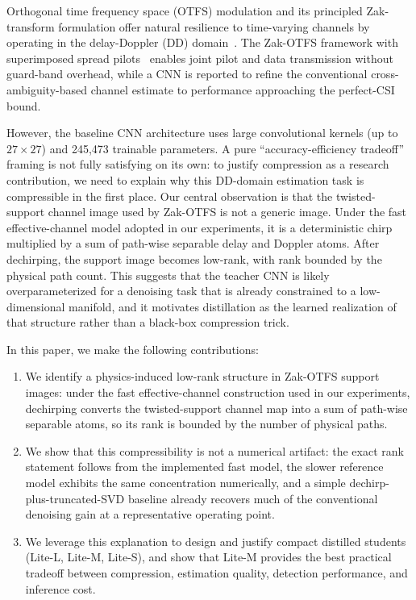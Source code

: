 \documentclass[conference]{IEEEtran}
\begin{document}
Orthogonal time frequency space (OTFS) modulation and its principled Zak-transform formulation offer natural resilience to time-varying channels by operating in the delay-Doppler (DD) domain~\cite{hadani2017otfs, mohammed2021ddzc}. The Zak-OTFS framework with superimposed spread pilots~\cite{zakotfs2024} enables joint pilot and data transmission without guard-band overhead, while a CNN is reported to refine the conventional cross-ambiguity-based channel estimate to performance approaching the perfect-CSI bound.

However, the baseline CNN architecture uses large convolutional kernels (up to $27 \times 27$) and 245,473 trainable parameters. A pure ``accuracy-efficiency tradeoff'' framing is not fully satisfying on its own: to justify compression as a research contribution, we need to explain why this DD-domain estimation task is compressible in the first place. Our central observation is that the twisted-support channel image used by Zak-OTFS is not a generic image. Under the fast effective-channel model adopted in our experiments, it is a deterministic chirp multiplied by a sum of path-wise separable delay and Doppler atoms. After dechirping, the support image becomes low-rank, with rank bounded by the physical path count. This suggests that the teacher CNN is likely overparameterized for a denoising task that is already constrained to a low-dimensional manifold, and it motivates distillation as the learned realization of that structure rather than a black-box compression trick.

In this paper, we make the following contributions:
\begin{enumerate}
    \item We identify a physics-induced low-rank structure in Zak-OTFS support images: under the fast effective-channel construction used in our experiments, dechirping converts the twisted-support channel map into a sum of path-wise separable atoms, so its rank is bounded by the number of physical paths.
    \item We show that this compressibility is not a numerical artifact: the exact rank statement follows from the implemented fast model, the slower reference model exhibits the same concentration numerically, and a simple dechirp-plus-truncated-SVD baseline already recovers much of the conventional denoising gain at a representative operating point.
    \item We leverage this explanation to design and justify compact distilled students (Lite-L, Lite-M, Lite-S), and show that Lite-M provides the best practical tradeoff between compression, estimation quality, detection performance, and inference cost.
\end{enumerate}
\end{document}
